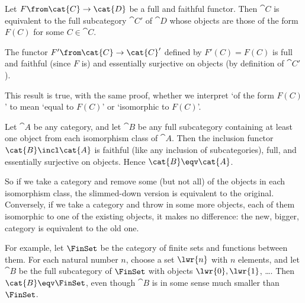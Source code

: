 \begin{cor}     
\label{cor:ff-emb}
Let $F\from \cat{C} \to \cat{D}$ be a full and faithful functor.  Then
$\cat{C}$ is equivalent to the full subcategory $\cat{C}'$ of $\cat{D}$
whose objects are those of the form $F(C)$ for some $C \in \cat{C}$.
\end{cor}

\begin{pf}
The functor $F'\from \cat{C} \to \cat{C}'$ defined by $F'(C) = F(C)$ is
full and faithful (since $F$ is) and essentially surjective on objects (by
definition of $\cat{C}'$).
\end{pf}

This result is true, with the same proof, whether we interpret `of the form
$F(C)$' to mean `equal to $F(C)$' or `isomorphic to $F(C)$'.

\begin{example}	
\label{eg:equivs-skellish}
Let $\cat{A}$ be any category, and let $\cat{B}$ be any full subcategory
containing at least one object from each isomorphism class of $\cat{A}$.
Then the inclusion functor $\cat{B} \incl \cat{A}$ is faithful (like any
inclusion of subcategories), full, and essentially surjective on objects.
Hence $\cat{B} \eqv \cat{A}$.

So if we take a category and remove some (but not all) of the objects in
each isomorphism class, the slimmed-down%
%
%
version is equivalent to the original.  Conversely, if we take a category
and throw in some more objects, each of them isomorphic to one of the
existing objects, it makes no difference: the new, bigger, category is
equivalent to the old one.

For example, let $\FinSet$%
%
%
be the category of finite%
%
%
sets and functions between them.  For each natural number $n$, choose a set
$\lwr{n}$ with $n$ elements, and let $\cat{B}$ be the full subcategory of
$\FinSet$ with objects $\lwr{0}, \lwr{1}$, \ldots.  Then $\cat{B} \eqv
\FinSet$, even though $\cat{B}$ is in some sense much smaller than
$\FinSet$.
\end{example}

